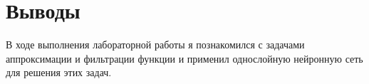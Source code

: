 \section{Выводы}
В ходе выполнения лабораторной работы я познакомился с задачами аппроксимации и фильтрации функции и применил однослойную нейронную сеть для решения этих задач.
\pagebreak
